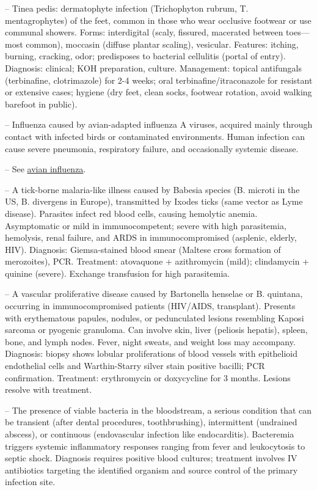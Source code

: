 -- Tinea pedis: dermatophyte infection (Trichophyton rubrum, T. mentagrophytes) of the feet, common in those who wear occlusive footwear or use communal showers. Forms: interdigital (scaly, fissured, macerated between toes—most common), moccasin (diffuse plantar scaling), vesicular. Features: itching, burning, cracking, odor; predisposes to bacterial cellulitis (portal of entry). Diagnosis: clinical; KOH preparation, culture. Management: topical antifungals (terbinafine, clotrimazole) for 2-4 weeks; oral terbinafine/itraconazole for resistant or extensive cases; hygiene (dry feet, clean socks, footwear rotation, avoid walking barefoot in public).

-- Influenza caused by avian-adapted influenza A viruses, acquired mainly through contact with infected birds or contaminated environments. Human infection can cause severe pneumonia, respiratory failure, and occasionally systemic disease.

-- See \hyperlink{Avian Influenza}{avian influenza}.

-- A tick-borne malaria-like illness caused by Babesia species (B. microti in the US, B. divergens in Europe), transmitted by Ixodes ticks (same vector as Lyme disease). Parasites infect red blood cells, causing hemolytic anemia. Asymptomatic or mild in immunocompetent; severe with high parasitemia, hemolysis, renal failure, and ARDS in immunocompromised (asplenic, elderly, HIV). Diagnosis: Giemsa-stained blood smear (Maltese cross formation of merozoites), PCR. Treatment: atovaquone + azithromycin (mild); clindamycin + quinine (severe). Exchange transfusion for high parasitemia.

-- A vascular proliferative disease caused by Bartonella henselae or B. quintana, occurring in immunocompromised patients (HIV/AIDS, transplant). Presents with erythematous papules, nodules, or pedunculated lesions resembling Kaposi sarcoma or pyogenic granuloma. Can involve skin, liver (peliosis hepatis), spleen, bone, and lymph nodes. Fever, night sweats, and weight loss may accompany. Diagnosis: biopsy shows lobular proliferations of blood vessels with epithelioid endothelial cells and Warthin-Starry silver stain positive bacilli; PCR confirmation. Treatment: erythromycin or doxycycline for 3 months. Lesions resolve with treatment.

-- The presence of viable bacteria in the bloodstream, a serious condition that can be transient (after dental procedures, toothbrushing), intermittent (undrained abscess), or continuous (endovascular infection like endocarditis). Bacteremia triggers systemic inflammatory responses ranging from fever and leukocytosis to septic shock. Diagnosis requires positive blood cultures; treatment involves IV antibiotics targeting the identified organism and source control of the primary infection site.

